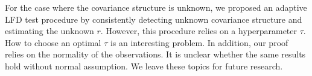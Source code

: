 \documentclass[12pt]{article} %
\newcommand{\bX}{\mathbf{X}}
\newcommand{\bJ}{\mathbf{J}}
\newcommand{\bC}{\mathbf{C}}
\theoremstyle{definition}
\begin{document}
For the case where the covariance structure is unknown,
we proposed an adaptive LFD test procedure by consistently detecting unknown covariance structure and estimating the unknown $r$.
However, this procedure relies on a hyperparameter $\tau$. 
How to choose an optimal $\tau$ is an interesting problem.
In addition, our proof relies on the normality of the observations.
It is unclear whether the same results hold without normal assumption.
We leave these topics for future research.



%
\end{document}
